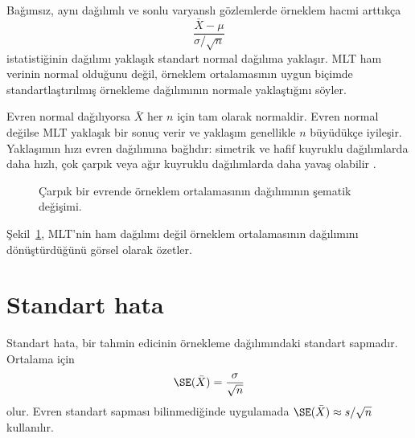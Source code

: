 Bağımsız, aynı dağılımlı ve sonlu varyanslı gözlemlerde örneklem hacmi
arttıkça
\[
\frac{\bar X-\mu}{\sigma/\sqrt n}
\]
istatistiğinin dağılımı yaklaşık standart normal dağılıma yaklaşır. MLT ham
verinin normal olduğunu değil, örneklem ortalamasının uygun biçimde
standartlaştırılmış örnekleme dağılımının normale yaklaştığını söyler.

Evren normal dağılıyorsa $\bar X$ her $n$ için tam olarak normaldir. Evren
normal değilse MLT yaklaşık bir sonuç verir ve yaklaşım genellikle $n$
büyüdükçe iyileşir. Yaklaşımın hızı evren dağılımına bağlıdır: simetrik ve
hafif kuyruklu dağılımlarda daha hızlı, çok çarpık veya ağır kuyruklu
dağılımlarda daha yavaş olabilir \citep{hogg2015,akdeniz1998,erbas2011}.

\begin{figure}[H]
\centering
{}
\caption{Çarpık bir evrende örneklem ortalamasının dağılımının şematik değişimi.}
\label{fig:clt-progression}
\end{figure}

Şekil~\ref{fig:clt-progression}, MLT'nin ham dağılımı değil örneklem
ortalamasının dağılımını dönüştürdüğünü görsel olarak özetler.

\section{Standart hata}
\label{sec:standard-error}

Standart hata, bir tahmin edicinin örnekleme dağılımındaki standart sapmadır.
Ortalama için
\[
\SE(\bar X)=\frac{\sigma}{\sqrt n}
\]
olur. Evren standart sapması bilinmediğinde uygulamada
$\SE(\bar X)\approx s/\sqrt n$ kullanılır.

